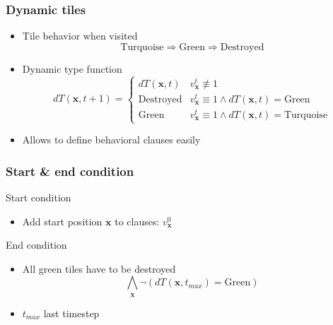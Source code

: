 \begin{frame}
	\frametitle{Dynamic tiles}
	\begin{itemize}
		\item Tile behavior when visited
		\begin{displaymath}
			\text{Turquoise} \Rightarrow \text{Green} \Rightarrow \text{Destroyed}
		\end{displaymath}
		\pause
		\item Dynamic type function
		\begin{displaymath}
			dT(\pmb x,t+1)=
			\begin{cases}
				dT(\pmb x, t) & v_{\pmb x}^{t} \not \equiv 1\\
				\text{Destroyed} & v_{\pmb x}^{t} \equiv 1 \wedge dT(\pmb x,t) = \text{Green}\\
				\text{Green} & v_{\pmb x}^{t} \equiv 1 \wedge dT(\pmb x,t)=\text{Turquoise}
			\end{cases}
		\end{displaymath}
		\pause
		\item Allows to define behavioral clauses easily
	\end{itemize}
\end{frame}

\begin{frame}
	\frametitle{Start \& end condition}
	\begin{block}{Start condition}
		\begin{itemize}
			\item Add start position $\pmb x$ to clauses: $v_{\pmb x}^{0}$
		\end{itemize}
	\end{block}

	\begin{block}{End condition}
		\begin{itemize}
			\item All green tiles have to be destroyed
			\begin{displaymath}
				\bigwedge_{\pmb x} \neg (dT(\pmb x, t_{max}) = \text{Green})
			\end{displaymath}
			\item $t_{max}$ last timestep
		\end{itemize}
	\end{block}
\end{frame}

